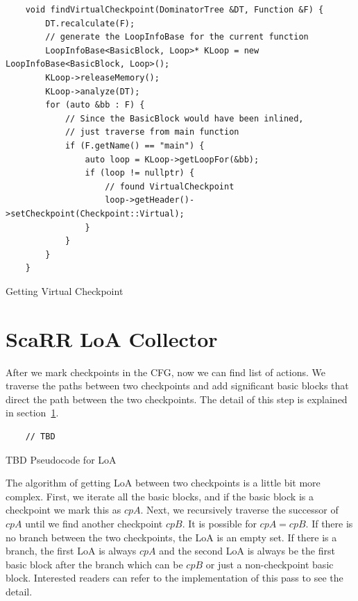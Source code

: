 \begin{listing}[htbp]
    \begin{verbatim}
    void findVirtualCheckpoint(DominatorTree &DT, Function &F) {
        DT.recalculate(F);
        // generate the LoopInfoBase for the current function
        LoopInfoBase<BasicBlock, Loop>* KLoop = new LoopInfoBase<BasicBlock, Loop>();
        KLoop->releaseMemory();
        KLoop->analyze(DT);
        for (auto &bb : F) {
            // Since the BasicBlock would have been inlined, 
            // just traverse from main function
            if (F.getName() == "main") {
                auto loop = KLoop->getLoopFor(&bb);
                if (loop != nullptr) {
                    // found VirtualCheckpoint
                    loop->getHeader()->setCheckpoint(Checkpoint::Virtual);
                }
            }
        }
    }
    \end{verbatim}
    \caption{Getting Virtual Checkpoint}
    \label{listing:virtual-cp}
\end{listing}




\section{ScaRR LoA Collector}
\label{sec:scarr-loa-collector}

After we mark checkpoints in the CFG, now we can find list of actions. We
traverse the paths between two checkpoints and add significant basic blocks that
direct the path between the two checkpoints.  The detail of this step is
explained in section~\ref{sec:scarr-loa-collector}.


\begin{listing}[htbp]
    \begin{verbatim}
    // TBD
    \end{verbatim}
    \caption{TBD Pseudocode for LoA}
    \label{listing:loa-pseudocode}
\end{listing}

The algorithm of getting LoA between two checkpoints is a little bit more
complex. First, we iterate all the basic blocks, and if the basic block is a
checkpoint we mark this as $cpA$. Next, we recursively traverse the successor of
$cpA$ until we find another checkpoint $cpB$. It is possible for $cpA = cpB$. If
there is no branch between the two checkpoints, the LoA is an empty set. If
there is a branch, the first LoA is always $cpA$ and the second LoA is always be
the first basic block after the branch \textemdash{} which can be $cpB$ or just
a non-checkpoint basic block. Interested readers can refer to the implementation
of this pass to see the detail.
